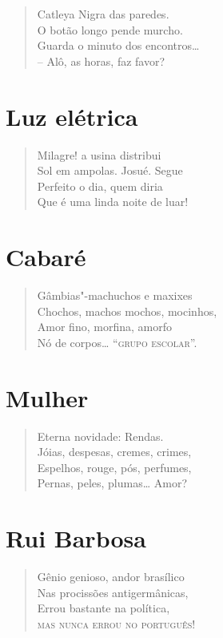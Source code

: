 {\begin{verse}
Catleya Nigra das paredes.\\
O botão longo pende murcho.\\
Guarda o minuto dos encontros\ldots{}\\
-- Alô, as horas, faz favor?
\end{verse}


\medskip
\section*{Luz elétrica}

\begin{verse}
Milagre! a usina distribui\\
Sol em ampolas. Josué. Segue\\
Perfeito o dia, quem diria\\
Que é uma linda noite de luar!
\end{verse}


\medskip
\section*{Cabaré}

\begin{verse}
Gâmbias"-machuchos e maxixes\\
Chochos, machos mochos, mocinhos,\\
Amor fino, morfina, amorfo\\
Nó de corpos\ldots{} ``\textsc{grupo escolar}''.
\end{verse}

\medskip
\section*{Mulher}

\begin{verse}
Eterna novidade: Rendas.\\
Jóias, despesas, cremes, crimes,\\
Espelhos, rouge, pós, perfumes,\\
Pernas, peles, plumas\ldots{} Amor?
\end{verse}

\medskip
\section*{Rui Barbosa}

\begin{verse}
Gênio genioso, andor brasílico\\
Nas procissões antigermânicas,\\
Errou bastante na política,\\
\textsc{mas nunca errou no português!}
\end{verse}

}
